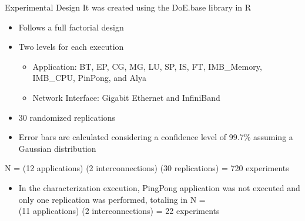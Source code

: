 \documentclass{beamer}
\begin{document}
\begin{frame}{Experimental Design}
It was created using the DoE.base library in R
\begin{itemize}
    \item Follows a full factorial design
    \pause\item Two levels for each execution
 \begin{itemize}
\item Application: \alert{BT}, \alert{EP}, \alert{CG}, \alert{MG}, \alert{LU}, \alert{SP}, \alert{IS}, \alert{FT}, \alert{IMB\_Memory}, \alert{IMB\_CPU}, \alert{PinPong}, and \alert{Alya}
\item Network Interface: \alert{Gigabit Ethernet} and \alert{InfiniBand}
\end{itemize}
    \pause\item 30 randomized replications
    \pause\item Error bars are calculated considering a \alert{confidence level of 99.7\%} assuming a Gaussian distribution
   \end{itemize}
N = (12 applications) \texttimes{} (2 interconnections) \texttimes{} (30 replications) = 720 experiments
\pause \begin{itemize}
    \item In the characterization execution, PingPong application was not executed and only one replication was performed, totaling in N = \\(11 applications) \texttimes{} (2 interconnections) = 22 experiments  

\end{itemize}
\end{frame}
\end{document}
